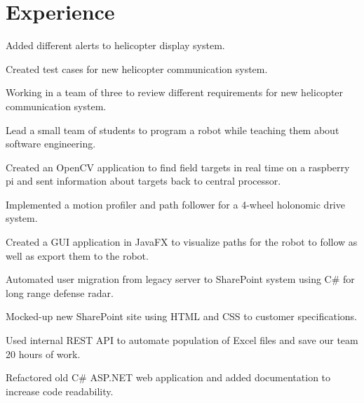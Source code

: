 \documentclass[]{deedy-resume-openfont}
\begin{document}
    
%
%

%
%
\section{Experience}
\hfill {}
\begin{tightemize}
	\item Added different alerts to helicopter display system.
	\item Created test cases for new helicopter communication system.
	\item Working in a team of three to review different requirements for new helicopter communication system.
\end{tightemize}
\sectionsep
{}\hfill {}
\begin{tightemize}
	\item Lead a small team of students to program a robot while teaching them about software engineering.
	\item Created an OpenCV application to find field targets in real time on a raspberry pi and sent information about targets back to central processor.
	\item Implemented a motion profiler and path follower for a 4-wheel holonomic drive system.
	\item Created a GUI application in JavaFX to visualize paths for the robot to follow as well as export them to the robot.
\end{tightemize}
\sectionsep
{}\hfill {}
\begin{tightemize}
	\item Automated user migration from legacy server to SharePoint system using C\# for long range defense radar.
	\item Mocked-up new SharePoint site using HTML and CSS to customer specifications.
	\item Used internal REST API to automate population of Excel files and save our team 20 hours of work.
	\item Refactored old C\# ASP.NET web application and added documentation to increase code readability.
\end{tightemize}
\end{document}
